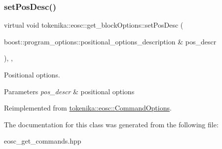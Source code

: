 \subsubsection{\texorpdfstring{set\+Pos\+Desc()}{setPosDesc()}}
{\footnotesize\ttfamily virtual void tokenika\+::eosc\+::get\+\_\+block\+Options\+::set\+Pos\+Desc (\begin{DoxyParamCaption}\item[{boost\+::program\+\_\+options\+::positional\+\_\+options\+\_\+description \&}]{pos\+\_\+descr }\end{DoxyParamCaption})\hspace{0.3cm}{\ttfamily [inline]}, {\ttfamily [protected]}, {\ttfamily [virtual]}}



Positional options. 


\begin{DoxyParams}{Parameters}
{\em pos\+\_\+descr} & positional options \\
\hline
\end{DoxyParams}


Reimplemented from \hyperlink{classtokenika_1_1eosc_1_1_command_options_ae2e98c683ae1eb3e5af1e81e60020447}{tokenika\+::eosc\+::\+Command\+Options}.



The documentation for this class was generated from the following file\+:\begin{DoxyCompactItemize}
\item 
eosc\+\_\+get\+\_\+commands.\+hpp\end{DoxyCompactItemize}
